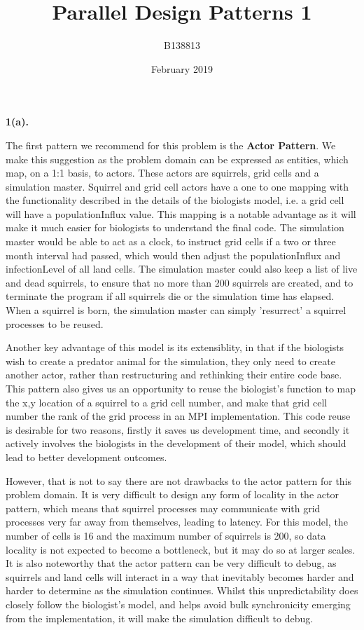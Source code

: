\documentclass[conference]{IEEEtran}
\title{Parallel Design Patterns 1}
\author{B138813}
\date{February 2019}
\begin{document}

\maketitle

\noindent\textbf{1(a).} \newline

The first pattern we recommend for this problem is the \textbf{Actor Pattern}. We make this suggestion as the problem domain can be expressed as entities, which map, on a 1:1 basis, to actors. These actors are squirrels, grid cells and a simulation master. Squirrel and grid cell actors have a one to one mapping with the functionality described in the details of the biologists model, i.e. a grid cell will have a populationInflux value. This mapping is a notable advantage as it will make it much easier for biologists to understand the final code. The simulation master would be able to act as a clock, to instruct grid cells if a two or three month interval had passed, which would then adjust the populationInflux and infectionLevel of all land cells. The simulation master could also keep a list of live and dead squirrels, to ensure that no more than 200 squirrels are created, and to terminate the program if all squirrels die or the simulation time has elapsed. When a squirrel is born, the simulation master can simply 'resurrect' a squirrel processes to be reused.

Another key advantage of this model is its extensiblity, in that if the biologists wish to create a predator animal for the simulation, they only need to create another actor, rather than restructuring and rethinking their entire code base. This pattern also gives us an opportunity to reuse the biologist's function to map the x,y location of a squirrel to a grid cell number, and make that grid cell number the rank of the grid process in an MPI implementation. This code reuse is desirable for two reasons, firstly it saves us development time, and secondly it actively involves the biologists in the development of their model, which should lead to better development outcomes.

However, that is not to say there are not drawbacks to the actor pattern for this problem domain. It is very difficult to design any form of locality in the actor pattern, which means that squirrel processes may communicate with grid processes very far away from themselves, leading to latency. For this model, the number of cells is 16 and the maximum number of squirrels is 200, so data locality is not expected to become a bottleneck, but it may do so at larger scales. It is also noteworthy that the actor pattern can be very difficult to debug, as squirrels and land cells will interact in a way that inevitably becomes harder and harder to determine as the simulation continues. Whilst this unpredictability does closely follow the biologist's model, and helps avoid bulk synchronicity emerging from the implementation, it will make the simulation difficult to debug.
\end{document}
